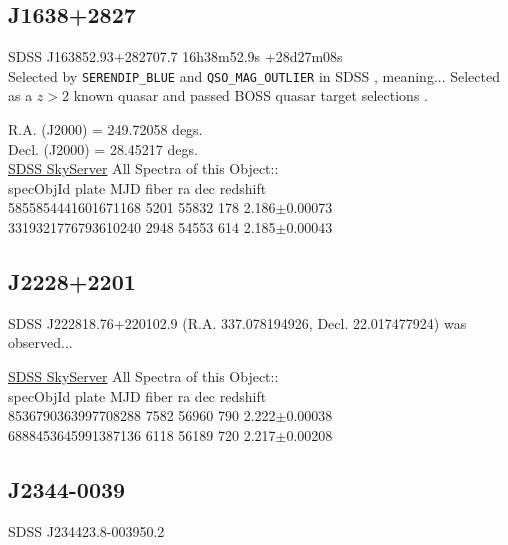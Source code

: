 \documentclass[a4paper,fleqn,usenatbib]{mnras}
\begin{document}



\subsection{J1638+2827}
SDSS J163852.93+282707.7       16h38m52.9s +28d27m08s  \\
Selected by {\tt SERENDIP\_BLUE} and {\tt QSO\_MAG\_OUTLIER} in SDSS \citep{Richards2002}, meaning...
Selected as a $z>2$ known quasar and passed BOSS quasar target selections \citep{Ross2012}. 


R.A. (J2000) = 249.72058 degs. \\
Decl. (J2000) = 28.45217 degs. \\
\href{skyserver.sdss.org/dr15/en/tools/explore/Summary.aspx?id=1237662301375824232}{SDSS SkyServer} 
All Spectra of this Object:: \\
specObjId	plate	MJD	fiber	ra	dec	redshift \\
5855854441601671168	5201	55832	178	2.186$\pm$0.00073\\
3319321776793610240	2948	54553	614	2.185$\pm$0.00043\\



\subsection{J2228+2201}
SDSS J222818.76+220102.9 (R.A. 337.078194926, Decl. 22.017477924) was observed... 

\href{skyserver.sdss.org/dr15/en/tools/explore/summary.aspx?id=1237678579819479655}{SDSS SkyServer}
All Spectra of this Object:: \\
specObjId	plate	MJD	fiber	ra	dec	redshift \\
8536790363997708288	7582	56960	790	2.222$\pm$0.00038\\
6888453645991387136	6118	56189	720	2.217$\pm$0.00208\\



\subsection{J2344-0039}
SDSS J234423.8-003950.2
\end{document}
